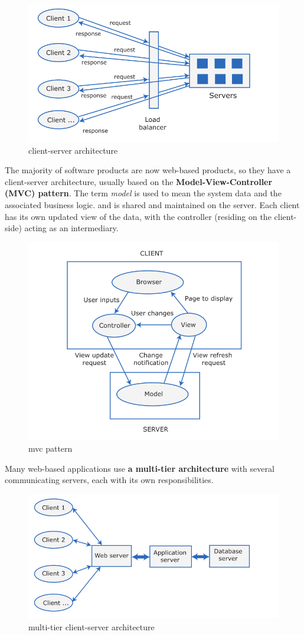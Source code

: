 \begin{figure}[ht]
   \centering
   \includegraphics[width=0.5\linewidth]{images/questions/client-server.png}
   \caption{client-server architecture}
   \label{fig:client-server}
\end{figure}
The majority of software products are now web-based products, so they have a client-server architecture, usually based on the \textbf{Model-View-Controller (MVC) pattern}.
The term \textit{model} is used to mean the system data and the associated business logic. and is shared and maintained on the server.
Each client has its own updated view of the data, with the controller (residing on the client-side) acting as an intermediary.

\begin{figure}[ht]
   \centering
   \includegraphics[width=0.5\linewidth]{images/questions/MVC.png}
   \caption{mvc pattern}
   \label{fig:mvc}
\end{figure}
Many web-based applications use \textbf{a multi-tier architecture} with several communicating servers, each with its own responsibilities.
\begin{figure}[ht]
   \centering
   \includegraphics[width=0.5\linewidth]{images/questions/multi-tier.png}
   \caption{multi-tier client-server architecture}
   \label{fig:multi-tier}
\end{figure}

